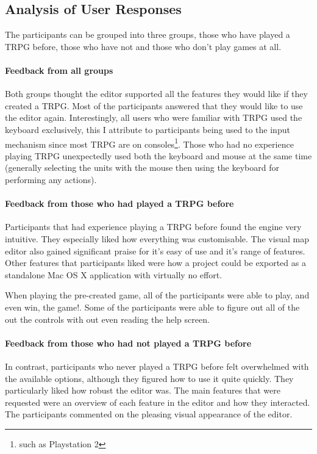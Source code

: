 \subsection{Analysis of User Responses}
The participants can be grouped into three groups, those who have played a TRPG before, those who have not and those who don't play games at all.
\paragraph{Feedback from  all groups\\}
Both groups thought the editor supported all the features they would like if they created a TRPG.  Most of the participants answered that they would like to use the editor again.  Interestingly, all users who were familiar with TRPG used the keyboard exclusively, this I attribute to participants being used to the input mechanism since most TRPG are on consoles\footnote{such as Playstation 2}. Those who had no experience playing TRPG unexpectedly used both the keyboard and mouse at the same time (generally selecting the units with the mouse then using the keyboard for performing any actions).

\paragraph{Feedback from those who had played a TRPG before\\}
Participants that had experience playing a TRPG before found the engine very intuitive. They especially liked how everything was customisable.  The visual map editor also gained significant praise for it's easy of use and it's range of features.  Other features that participants liked were how a project could be exported as a standalone Mac OS X application with virtually no effort. 

When playing the pre-created game, all of the participants were able to play, and even win, the game!. Some of the participants were able to figure out all of the out the controls with out even reading the help screen. 

\paragraph{Feedback from those who had not played a TRPG  before\\} 
In contrast, participants who never played a TRPG before felt overwhelmed with the available options, although they figured how to use it quite quickly.  They particularly liked how robust the editor was. The main features that were requested were  an overview of each feature in the editor and how they interacted.  The participants commented on the pleasing visual appearance of the editor.

